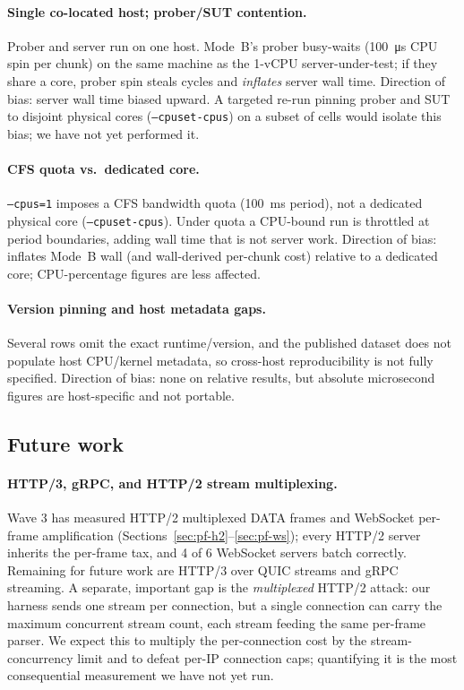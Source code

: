\paragraph{Single co-located host; prober/SUT contention.}
Prober and server run on one host. Mode~B's prober busy-waits
(\SI{100}{\micro\second} CPU spin per chunk) on the same machine
as the 1-vCPU server-under-test; if they share a core, prober
spin steals cycles and \emph{inflates} server wall time. Direction
of bias: server wall time biased upward. A targeted re-run pinning
prober and SUT to disjoint physical cores (\texttt{--cpuset-cpus})
on a subset of cells would isolate this bias; we have not yet
performed it.

\paragraph{CFS quota vs.\ dedicated core.}
\texttt{--cpus=1} imposes a CFS bandwidth quota (\SI{100}{\milli\second}
period), not a dedicated physical core (\texttt{--cpuset-cpus}).
Under quota a CPU-bound run is throttled at period boundaries,
adding wall time that is not server work. Direction of bias:
inflates Mode~B wall (and wall-derived per-chunk cost) relative to
a dedicated core; CPU-percentage figures are less affected.

\paragraph{Version pinning and host metadata gaps.}
Several rows omit the exact runtime/version, and the published
dataset does not populate host CPU/kernel metadata, so cross-host
reproducibility is not fully specified. Direction of bias: none on
relative results, but absolute microsecond figures are
host-specific and not portable.

\subsection{Future work}
\label{sec:future-work}

\paragraph{HTTP/3, gRPC, and HTTP/2 stream multiplexing.}
Wave 3 has measured HTTP/2 multiplexed DATA frames and WebSocket
per-frame amplification (Sections~\ref{sec:pf-h2}--\ref{sec:pf-ws});
every HTTP/2 server inherits the per-frame tax, and 4 of 6
WebSocket servers batch correctly. Remaining for future work are
HTTP/3 over QUIC streams and gRPC streaming. A separate, important
gap is the \emph{multiplexed} HTTP/2 attack: our harness sends one
stream per connection, but a single connection can carry the
maximum concurrent stream count, each stream feeding the same
per-frame parser. We expect this to multiply the per-connection
cost by the stream-concurrency limit and to defeat per-IP
connection caps; quantifying it is the most consequential
measurement we have not yet run.

